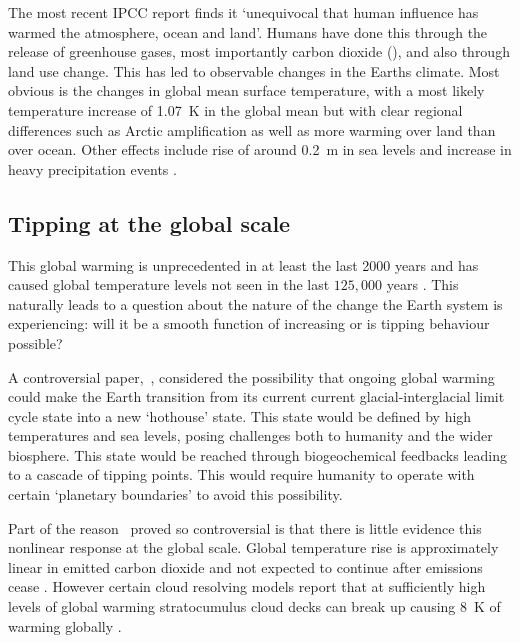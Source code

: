 The most recent IPCC report \parencite{AR6} finds it `unequivocal that human influence has warmed the atmosphere, ocean and land'. Humans have done this through the release of greenhouse
gases, most importantly carbon dioxide (), and also through land use change. This has led to observable changes in the Earths climate. Most obvious is the changes in global mean surface
temperature, with a most likely temperature increase of \SI{1.07}{\kelvin} \parencite{AR6} in the global mean but with clear regional differences \parencite{Morice2021} such as
Arctic amplification as well as more warming over land than over ocean. Other effects include rise of around \SI{0.2}{\meter} in sea levels \parencite{Frederikse2020} and increase in heavy precipitation
events \parencite{Fischer2016}.

\subsection{Tipping at the global scale}
This global warming is unprecedented in at least the last 2000 years and has caused global temperature levels not seen in the last $125,000$ years \parencite{AR6}. This naturally leads to a question
about the nature of the change the Earth system is experiencing: will it be a smooth function of increasing  or is tipping behaviour possible?

A controversial paper,~\cite{Steffen2018}, considered the possibility that ongoing global warming could make the Earth transition from its current current glacial-interglacial limit cycle
state into a new `hothouse' state. This state would be defined by high temperatures and sea levels, posing challenges both to humanity and the wider biosphere. This state would be reached
through biogeochemical feedbacks leading to a cascade of tipping points. This would require humanity to operate with certain `planetary boundaries' \parencite{Rockstrom2009} to avoid this possibility.

Part of the reason~\cite{Steffen2018} proved so controversial is that there is little evidence this nonlinear response at the global scale. Global temperature rise is approximately linear
in emitted carbon dioxide \parencite{Allen2009,Rogelj2019} and not expected to continue after emissions cease \parencite{MacDougall2020}. However certain cloud resolving models
report that at sufficiently high levels of global warming stratocumulus cloud decks can break up causing \SI{8}{\kelvin} of warming globally \parencite{Schneider2019}.

